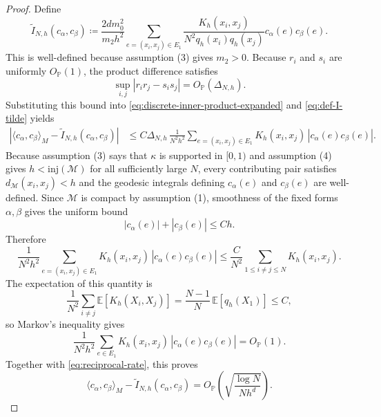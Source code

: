\documentclass[10pt,a4paper]{amsart}
\newcommand{\mc}[1]{\mathcal{#1}}
\begin{document}
\begin{proof}
Define
\begin{equation}
\label{eq:def-I-tilde}
\widetilde I_{N,h}(c_\alpha,c_\beta)
\coloneq
\frac{2dm_0^2}{m_2h^2}
\sum_{e=(x_i,x_j)\in E_1}
\frac{K_h(x_i,x_j)}{N^2q_h(x_i)q_h(x_j)}c_\alpha(e)c_\beta(e).
\end{equation}
This is well-defined because assumption \textup{(3)} gives $m_2>0$.
Because $r_i$ and $s_i$ are uniformly $O_{\mathbb P}(1)$, the product difference satisfies
\begin{equation}
\sup_{i,j}|r_ir_j-s_is_j|
=
O_{\mathbb P}(\Delta_{N,h}).
\end{equation}
Substituting this bound into \eqref{eq:discrete-inner-product-expanded} and \eqref{eq:def-I-tilde} yields
\begin{align}
\label{eq:difference-I-Itilde}
\left|\langle c_\alpha,c_\beta\rangle_M-\widetilde I_{N,h}(c_\alpha,c_\beta)\right|
&\le
C\Delta_{N,h}\,
\frac{1}{N^2h^2}
\sum_{e=(x_i,x_j)\in E_1}
K_h(x_i,x_j)\,|c_\alpha(e)c_\beta(e)|.
\end{align}
Because assumption \textup{(3)} says that $\kappa$ is supported in $[0,1)$ and assumption \textup{(4)} gives $h<\mathrm{inj}(\mc{M})$ for all sufficiently large $N$, every contributing pair satisfies $d_{\mc{M}}(x_i,x_j)<h$ and the geodesic integrals defining $c_\alpha(e)$ and $c_\beta(e)$ are well-defined. Since $\mc{M}$ is compact by assumption \textup{(1)}, smoothness of the fixed forms $\alpha,\beta$ gives the uniform bound
\begin{equation}
\label{eq:cochain-size}
|c_\alpha(e)|+|c_\beta(e)|\le Ch.
\end{equation}
Therefore
\begin{equation}
\frac{1}{N^2h^2}
\sum_{e=(x_i,x_j)\in E_1} K_h(x_i,x_j)\,|c_\alpha(e)c_\beta(e)|
\le
\frac{C}{N^2}
\sum_{1\le i\neq j\le N} K_h(x_i,x_j).
\end{equation}
The expectation of this quantity is
\begin{equation}
\frac{1}{N^2}\sum_{i\neq j}\mathbb E[K_h(X_i,X_j)]
=
\frac{N-1}{N}\,\mathbb E[q_h(X_1)]
\le C,
\end{equation}
so Markov's inequality gives
\begin{equation}
\frac{1}{N^2h^2}
\sum_{e\in E_1}K_h(x_i,x_j)\,|c_\alpha(e)c_\beta(e)|
=
O_{\mathbb P}(1).
\end{equation}
Together with \eqref{eq:reciprocal-rate}, this proves
\begin{equation}
\label{eq:reciprocal-replacement-error}
\langle c_\alpha,c_\beta\rangle_M-\widetilde I_{N,h}(c_\alpha,c_\beta)
=
O_{\mathbb P}\!\left(\sqrt{\frac{\log N}{N h^d}}\right).
\end{equation}


\end{proof}
\end{document}
